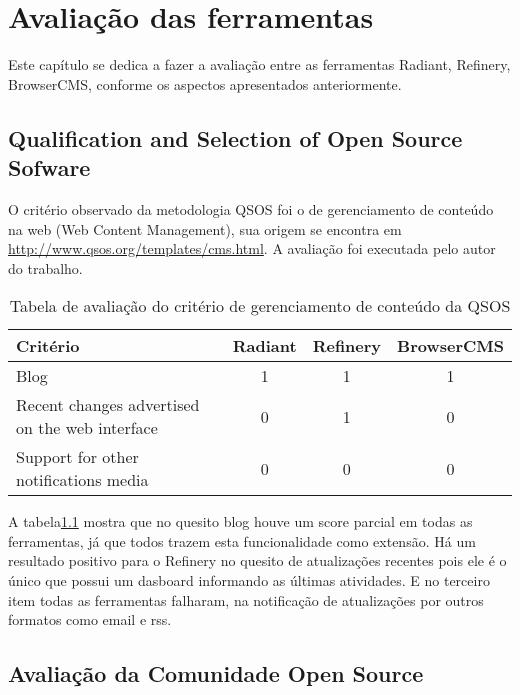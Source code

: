 \chapter{Avaliação das ferramentas}

Este capítulo se dedica a fazer a avaliação entre as ferramentas Radiant, Refinery, BrowserCMS, conforme os aspectos apresentados anteriormente.

\section{Qualification and Selection of Open Source Sofware}

O critério observado da metodologia QSOS foi o de gerenciamento de conteúdo na web (Web Content Management), sua origem se encontra em \url{http://www.qsos.org/templates/cms.html}. A avaliação foi executada pelo autor do trabalho. 

\begin{table}[ht]
\caption{Tabela de avaliação do critério de gerenciamento de conteúdo da QSOS } %
\centering %
\begin{tabular}{p{4.2cm} | c | c | c} %
\hline\hline %
Critério & Radiant & Refinery & BrowserCMS  \\ [0.5ex] %
\hline %
Blog        & 1  & 1   & 1    \\ \hline
Recent changes advertised on the web interface  & 0 & 1 & 0    \\ \hline
Support for other notifications media & 0 & 0 & 0 \\ [1ex] %
\hline %
\end{tabular}
\label{table:qsos_avaliacao_ferramentas} %
\end{table}

A tabela\ref{table:qsos_avaliacao_ferramentas} mostra que no quesito blog houve um score parcial em todas as ferramentas, já que todos trazem esta funcionalidade como extensão. Há um resultado positivo para o Refinery no quesito de atualizações recentes pois ele é o único que possui um dasboard informando as últimas atividades. E no terceiro item todas as ferramentas falharam, na notificação de atualizações por outros formatos como email e rss.

\section{Avaliação da Comunidade Open Source}

